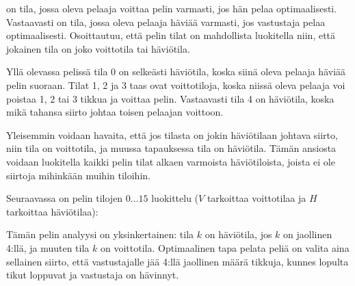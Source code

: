  on tila, jossa oleva pelaaja voittaa
pelin varmasti, jos hän pelaa optimaalisesti.
Vastaavasti  on tila,
jossa oleva pelaaja häviää varmasti, jos vastustaja
pelaa optimaalisesti.
Osoittautuu, että pelin tilat on mahdollista luokitella
niin, että jokainen tila on joko voittotila tai häviötila.

Yllä olevassa pelissä tila 0 on selkeästi häviötila,
koska siinä oleva pelaaja häviää pelin suoraan.
Tilat 1, 2 ja 3 taas ovat voittotiloja,
koska niissä oleva pelaaja voi poistaa
1, 2 tai 3 tikkua ja voittaa pelin.
Vastaavasti tila 4 on häviötila, koska mikä tahansa
siirto johtaa toisen pelaajan voittoon.

Yleisemmin voidaan havaita, että jos tilasta on
jokin häviötilaan johtava siirto, niin tila on voittotila,
ja muussa tapauksessa tila on häviötila.
Tämän ansiosta voidaan luokitella kaikki pelin tilat
alkaen varmoista häviötiloista, joista ei ole siirtoja
mihinkään muihin tiloihin.

Seuraavassa on pelin tilojen $0 \ldots 15$ luokittelu
($V$ tarkoittaa voittotilaa ja $H$ tarkoittaa häviötilaa):
\begin{center}
\end{center}

Tämän pelin analyysi on yksinkertainen:
tila $k$ on häviötila, jos $k$ on jaollinen 4:llä,
ja muuten tila $k$ on voittotila.
Optimaalinen tapa pelata peliä on
valita aina sellainen siirto, että vastustajalle
jää 4:llä jaollinen määrä tikkuja,
kunnes lopulta tikut loppuvat ja vastustaja on hävinnyt.

